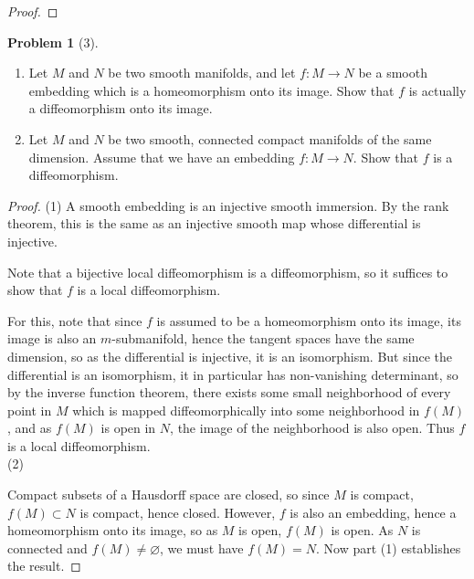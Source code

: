 \documentclass[reqno]{amsart}
\theoremstyle{definition}
\newtheorem{problem}[theorem]{Problem}
\theoremstyle{remark}
\begin{document}
\begin{proof}
    \end{proof}





    \begin{problem}[3]
        \begin{enumerate}
            \item Let $M$ and $N$ be two smooth
                manifolds, and let
                $f \colon M \to N$ be a smooth
                embedding which is a homeomorphism
                onto its image. Show that
                $f$ is actually a diffeomorphism onto
                its image.
            \item Let $M$ and $N$ be two smooth,
                connected compact manifolds of the
                same dimension. Assume that we
                have an embedding
                $f \colon M \to N$. Show that
                $f$ is a diffeomorphism.
        \end{enumerate}
    \end{problem}

    \begin{proof}
        (1) A smooth embedding is an
        injective smooth immersion. By the rank theorem,
        this is the same as an injective smooth map
        whose differential is injective. 

        Note that a bijective local diffeomorphism
        is a diffeomorphism, so it suffices
        to show that $f$ is a local diffeomorphism.

        For this, note that
        since $f$ is assumed to be a homeomorphism onto
        its image, its image is also an
        $m$-submanifold, hence the tangent spaces have the same
        dimension, so as the differential is injective,
        it is an isomorphism. But
        since the differential is an isomorphism, it
        in particular has non-vanishing determinant, so
        by the inverse function theorem, there
        exists some small neighborhood
        of every point in $M$ which is mapped diffeomorphically
        into some neighborhood in
        $f(M)$, and as $f(M)$ is open in $N$, the image
        of the neighborhood is also open.
        Thus $f$ is a local diffeomorphism.\\
        \linebreak
        (2) 


        Compact subsets of a Hausdorff space are
        closed, so since $M$ is compact,
        $f(M)\subset N$ is compact, hence closed.
        However, $f$ is also an embedding, hence
        a homeomorphism onto its image, so as
        $M$ is open, $f(M)$ is open. As
        $N$ is connected and $f(M) \neq \varnothing$, we must
        have $f(M) = N$. Now part (1) establishes the
        result.
    \end{proof}
\end{document}
